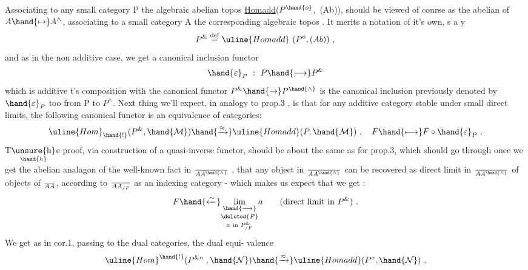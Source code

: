 
Associating to any small category P the algebraic abelian topos
\uline{Homadd}($P^{\hand{o}}$,~(Ab)), should be viewed of course as the abelian  of
$A \hand{\mapsto} A^{\wedge}$, associating to a small category A the corresponding algebraic
topos . It merits a notation of it's own, s a y
\[ P^{\&} \overset{\mathrm{def}}{=} \uline{Homadd}\ (P^{o}, (Ab)) \ , \]
and as  in the non additive case, we get a canonical inclusion functor
\[ \hand{\varepsilon}_{P} \ : \ P \hand{\longrightarrow} P^{\&} \]
which is additive  \hand{(}t's composition with the canonical functor $P^{\&}\hand{\to} P^{\hand{\wedge}}$ is
 the canonical inclusion previously denoted by $\hand{\varepsilon}_{P}$ too from P to $P^{\wedge}$.\hand{)}
Next thing we'll expect, in analogy to prop.3 , is that  for any
additive category  stable under small direct limits, the following
canonical functor is an equivalence of categories:
\margin{(**)}
\[ \uline{Hom}_{\hand{!}}(P^{\&}, \hand{\mathcal{M}}) \hand{\xrightarrow{\approx}} \uline{Homadd}(P, \hand{\mathcal{M}}) \ , \quad F \hand{\longmapsto} F \circ \hand{\varepsilon}_{P} \ . \]
T\(\underset{\hand{h}}{\text{\unsure{h}}}\)e proof, via construction of a quasi-inverse functor, should be about
the same as for prop.3, which should go through once we get the abelian
analagon of the well-known fact in $\over{A}{A}^{\hand{\wedge}}$ , that any object  in $\over{A}{A}^{\hand{\wedge}}$ can be
recovered as direct limit in $\over{A}{A}^{\hand{\wedge}}$ of objects of $\over{A}{A}$, according to $\over{A}{A}_{/F}$ as
an indexing category - which makes us expect that we get  :
\[ F \hand{\xleftarrow{\sim}} \underset{a \text{ in } P^{\&}_{/F}}{\underset{\deleted{P}}{\underset{\hand{\longrightarrow}}{\mathrm{lim}}}} a \qquad (\text{direct limit in } P^{\&}) \ . \]
We  get as in cor.1, passing to the dual categories, the dual equi-%
valence
\[ \uline{Hom}^{\hand{!}}(P^{\& o} \ , \hand{\mathcal{N}}) \hand{\xrightarrow{\approx}} \uline{Homadd}(P^{o}, \hand{\mathcal{N}}) \ , \]
